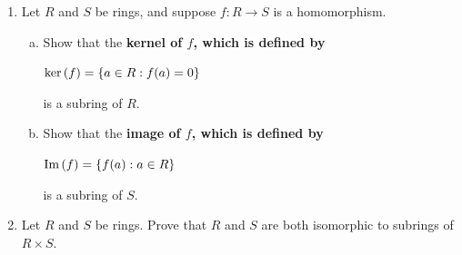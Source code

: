 \documentclass[11pt,fleqn,dvipsnames,usenames]{article}
\begin{document}
\begin{enumerate}
\item Let $R$ and $S$ be rings, and suppose $f:R\to S$ is a homomorphism.
\begin{enumerate}[(a)]
\item Show that the \bf kernel \md of $f$, which is defined by
\begin{center}
$\text{ker}\left(f\right) = \left\{a\in R: f(a) = 0\right\}$
\end{center}
is a subring of $R$.
\item Show that the \bf image \md of $f$, which is defined by
\begin{center}
$\text{Im}\left(f\right) = \left\{f(a):a\in R\right\}$
\end{center}
is a subring of $S$.
\end{enumerate}

\item Let $R$ and $S$ be rings.  Prove that $R$ and $S$ are both isomorphic to subrings of $R\times S$.
\end{enumerate}
\end{document}
